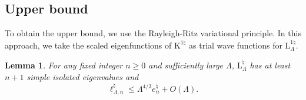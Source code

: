 \documentclass[a4paper,11pt,reqno]{amsart}
\newtheorem{lemma}[theorem]{Lemma}
\theoremstyle{definition}
\numberwithin{equation}{section}
\newcommand{\Lrm}{\mathrm{L}}
\newcommand{\bosfer}{{\natural}}
\begin{document}
\subsection{Upper bound}
To obtain  the upper bound, we use the Rayleigh-Ritz variational principle. In this approach, we take the scaled eigenfunctions of  $\mathrm{K}^{1\bosfer}$ as trial wave functions for  $\Lrm^{1\bosfer}_\Lambda$.
\begin{lemma} \label{l:upperbound} For any  fixed  integer $n\ge 0$ and  sufficiently large $\Lambda$, $\Lrm_\Lambda^\bosfer$ has at least $n+1$  simple isolated eigenvalues and 
\begin{equation}\label{upper_bound}
  \ell_{\Lambda,n}^\bosfer \leq \Lambda^{4/3}e^\bosfer_{n} + O(\Lambda) .
\end{equation}
\end{lemma}
\end{document}
